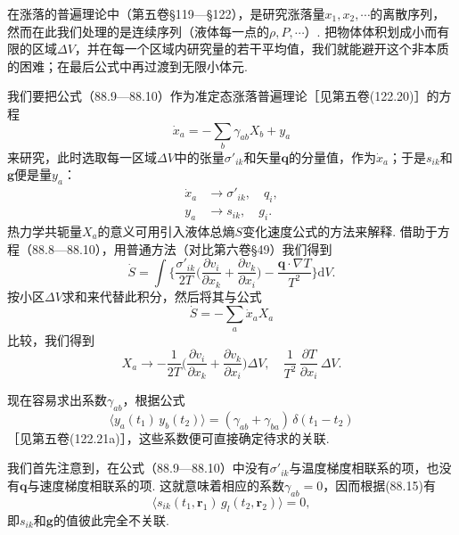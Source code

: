 在涨落的普遍理论中（第五卷§119—§122），是研究涨落量$x_{1},x_{2},\cdots$的离散序列，然而在此我们处理的是连续序列（液体每一点的$\rho,P,\cdots$）. 把物体体积划成小而有限的区域$\Delta V$，并在每一个区域内研究量的若干平均值，我们就能避开这个非本质的困难；在最后公式中再过渡到无限小体元.

我们要把公式（88.9—88.10）作为准定态涨落普遍理论［见第五卷(122.20)］的方程
\begin{equation}
\dot{x}_{a}=-\sum_{b}\gamma_{ab}X_{b}+y_{a}
\end{equation}
来研究，此时选取每一区域$\Delta V$中的张量${\sigma'}_{ik}$和矢量$\bm{q}$的分量值，作为$\dot{x}_{a}$；于是$s_{ik}$和$\bm{g}$便是量$y_{a}$：
\begin{equation}
\begin{aligned}
\dot{x}_{a}&\to{\sigma'}_{ik},\quad q_{i},\\
y_{a}&\to s_{ik},\quad g_{i}.
\end{aligned}
\end{equation}
热力学共轭量$X_{a}$的意义可用引入液体总熵$S$变化速度公式的方法来解释. 借助于方程（88.8—88.10），用普通方法（对比第六卷§49）我们得到
\begin{equation}
\dot{S}=\int\biggl\{\frac{{\sigma'}_{ik}}{2T}\biggl(\frac{\partial v_{i}}{\partial x_{k}}+\frac{\partial v_{k}}{\partial x_{i}}\biggr)-\frac{\bm{q}\cdot\nabla T}{T^{2}}\biggr\}\mathrm{d}V.
\end{equation}
按小区$\Delta V$求和来代替此积分，然后将其与公式
\begin{equation*}
\dot{S}=-\sum_{a}\dot{x}_{a}X_{a}
\end{equation*}
比较，我们得到
\begin{equation}
X_{a}\to-\frac{1}{2T}\biggl(\frac{\partial v_{i}}{\partial x_{k}}+\frac{\partial v_{k}}{\partial x_{i}}\biggr)\Delta V,\quad\frac{1}{T^{2}}\,\frac{\partial T}{\partial x_{i}}\,\Delta V.
\end{equation}

现在容易求出系数$\gamma_{ab}$，根据公式
\begin{equation}
\bigl\langle y_{a}(t_{1})\,y_{b}(t_{2})\bigr\rangle=(\gamma_{ab}+\gamma_{ba})\,\delta(t_{1}-t_{2})
\end{equation}
［见第五卷(122.21a)］，这些系数便可直接确定待求的关联.

我们首先注意到，在公式（88.9—88.10）中没有${\sigma'}_{ik}$与温度梯度相联系的项，也没有$\bm{q}$与速度梯度相联系的项. 这就意味着相应的系数$\gamma_{ab}=0$，因而根据(88.15)有
\begin{equation}
\bigl\langle s_{ik}(t_{1},\bm{r}_{1})\,g_{l}(t_{2},\bm{r}_{2})\bigr\rangle=0,
\end{equation}
即$s_{ik}$和$\bm{g}$的值彼此完全不关联.

